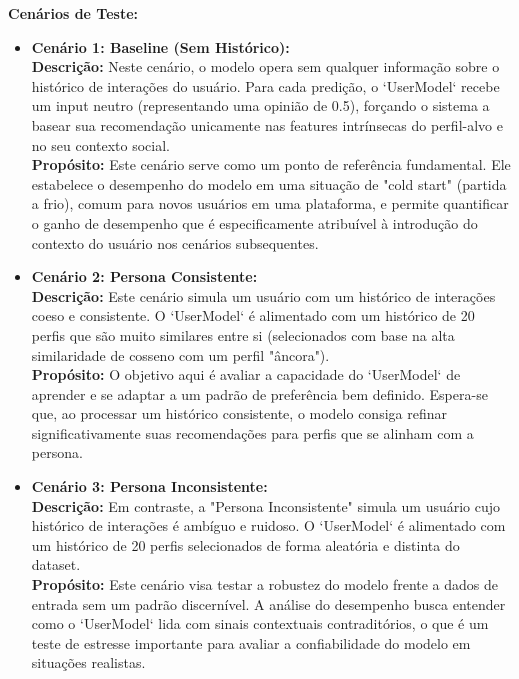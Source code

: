 \textbf{Cenários de Teste:}
\begin{itemize}
    \item \textbf{Cenário 1: Baseline (Sem Histórico):}
    \\ \textbf{Descrição:} Neste cenário, o modelo opera sem qualquer informação sobre o histórico de interações do usuário. Para cada predição, o `UserModel` recebe um input neutro (representando uma opinião de 0.5), forçando o sistema a basear sua recomendação unicamente nas features intrínsecas do perfil-alvo e no seu contexto social.
    \\ \textbf{Propósito:} Este cenário serve como um ponto de referência fundamental. Ele estabelece o desempenho do modelo em uma situação de "cold start" (partida a frio), comum para novos usuários em uma plataforma, e permite quantificar o ganho de desempenho que é especificamente atribuível à introdução do contexto do usuário nos cenários subsequentes.

    \item \textbf{Cenário 2: Persona Consistente:}
    \\ \textbf{Descrição:} Este cenário simula um usuário com um histórico de interações coeso e consistente. O `UserModel` é alimentado com um histórico de 20 perfis que são muito similares entre si (selecionados com base na alta similaridade de cosseno com um perfil "âncora").
    \\ \textbf{Propósito:} O objetivo aqui é avaliar a capacidade do `UserModel` de aprender e se adaptar a um padrão de preferência bem definido. Espera-se que, ao processar um histórico consistente, o modelo consiga refinar significativamente suas recomendações para perfis que se alinham com a persona.

    \item \textbf{Cenário 3: Persona Inconsistente:}
    \\ \textbf{Descrição:} Em contraste, a "Persona Inconsistente" simula um usuário cujo histórico de interações é ambíguo e ruidoso. O `UserModel` é alimentado com um histórico de 20 perfis selecionados de forma aleatória e distinta do dataset.
    \\ \textbf{Propósito:} Este cenário visa testar a robustez do modelo frente a dados de entrada sem um padrão discernível. A análise do desempenho busca entender como o `UserModel` lida com sinais contextuais contraditórios, o que é um teste de estresse importante para avaliar a confiabilidade do modelo em situações realistas.
\end{itemize}

